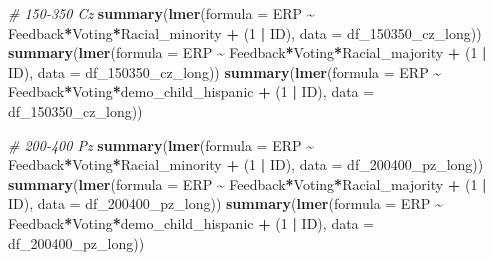 \documentclass[
]{article}
\newenvironment{Shaded}{\begin{snugshade}}{\end{snugshade}}
\newcommand{\AttributeTok}[1]{\textcolor[rgb]{0.13,0.29,0.53}{#1}}
\newcommand{\CommentTok}[1]{\textcolor[rgb]{0.56,0.35,0.01}{\textit{#1}}}
\newcommand{\DecValTok}[1]{\textcolor[rgb]{0.00,0.00,0.81}{#1}}
\newcommand{\FunctionTok}[1]{\textcolor[rgb]{0.13,0.29,0.53}{\textbf{#1}}}
\newcommand{\NormalTok}[1]{#1}
\newcommand{\SpecialCharTok}[1]{\textcolor[rgb]{0.81,0.36,0.00}{\textbf{#1}}}
\begin{document}
\begin{Shaded}
\begin{Highlighting}[]
\CommentTok{\# 150{-}350 Cz}
\FunctionTok{summary}\NormalTok{(}\FunctionTok{lmer}\NormalTok{(}\AttributeTok{formula =}\NormalTok{ ERP }\SpecialCharTok{\textasciitilde{}}\NormalTok{ Feedback}\SpecialCharTok{*}\NormalTok{Voting}\SpecialCharTok{*}\NormalTok{Racial\_minority }\SpecialCharTok{+}\NormalTok{ (}\DecValTok{1} \SpecialCharTok{|}\NormalTok{ ID), }\AttributeTok{data =}\NormalTok{ df\_150350\_cz\_long))}
\FunctionTok{summary}\NormalTok{(}\FunctionTok{lmer}\NormalTok{(}\AttributeTok{formula =}\NormalTok{ ERP }\SpecialCharTok{\textasciitilde{}}\NormalTok{ Feedback}\SpecialCharTok{*}\NormalTok{Voting}\SpecialCharTok{*}\NormalTok{Racial\_majority }\SpecialCharTok{+}\NormalTok{ (}\DecValTok{1} \SpecialCharTok{|}\NormalTok{ ID), }\AttributeTok{data =}\NormalTok{ df\_150350\_cz\_long))}
\FunctionTok{summary}\NormalTok{(}\FunctionTok{lmer}\NormalTok{(}\AttributeTok{formula =}\NormalTok{ ERP }\SpecialCharTok{\textasciitilde{}}\NormalTok{ Feedback}\SpecialCharTok{*}\NormalTok{Voting}\SpecialCharTok{*}\NormalTok{demo\_child\_hispanic }\SpecialCharTok{+}\NormalTok{ (}\DecValTok{1} \SpecialCharTok{|}\NormalTok{ ID), }\AttributeTok{data =}\NormalTok{ df\_150350\_cz\_long))}

\CommentTok{\# 200{-}400 Pz}
\FunctionTok{summary}\NormalTok{(}\FunctionTok{lmer}\NormalTok{(}\AttributeTok{formula =}\NormalTok{ ERP }\SpecialCharTok{\textasciitilde{}}\NormalTok{ Feedback}\SpecialCharTok{*}\NormalTok{Voting}\SpecialCharTok{*}\NormalTok{Racial\_minority }\SpecialCharTok{+}\NormalTok{ (}\DecValTok{1} \SpecialCharTok{|}\NormalTok{ ID), }\AttributeTok{data =}\NormalTok{ df\_200400\_pz\_long))}
\FunctionTok{summary}\NormalTok{(}\FunctionTok{lmer}\NormalTok{(}\AttributeTok{formula =}\NormalTok{ ERP }\SpecialCharTok{\textasciitilde{}}\NormalTok{ Feedback}\SpecialCharTok{*}\NormalTok{Voting}\SpecialCharTok{*}\NormalTok{Racial\_majority }\SpecialCharTok{+}\NormalTok{ (}\DecValTok{1} \SpecialCharTok{|}\NormalTok{ ID), }\AttributeTok{data =}\NormalTok{ df\_200400\_pz\_long))}
\FunctionTok{summary}\NormalTok{(}\FunctionTok{lmer}\NormalTok{(}\AttributeTok{formula =}\NormalTok{ ERP }\SpecialCharTok{\textasciitilde{}}\NormalTok{ Feedback}\SpecialCharTok{*}\NormalTok{Voting}\SpecialCharTok{*}\NormalTok{demo\_child\_hispanic }\SpecialCharTok{+}\NormalTok{ (}\DecValTok{1} \SpecialCharTok{|}\NormalTok{ ID), }\AttributeTok{data =}\NormalTok{ df\_200400\_pz\_long))}


\end{Highlighting}
\end{Shaded}
\end{document}
